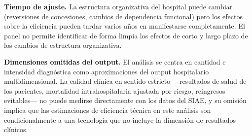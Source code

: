 \textbf{Tiempo de ajuste.} La estructura organizativa del hospital puede cambiar (reversiones de concesiones, cambios de dependencia funcional) pero los efectos sobre la eficiencia pueden tardar varios años en manifestarse completamente. El panel no permite identificar de forma limpia los efectos de corto y largo plazo de los cambios de estructura organizativa.

\textbf{Dimensiones omitidas del output.} El análisis se centra en cantidad e intensidad diagnóstica como aproximaciones del output hospitalario multidimensional. La calidad clínica en sentido estricto ---resultados de salud de los pacientes, mortalidad intrahospitalaria ajustada por riesgo, reingresos evitables--- no puede medirse directamente con los datos del SIAE, y su omisión implica que las estimaciones de eficiencia técnica en este análisis son condicionalmente a una tecnología que no incluye la dimensión de resultados clínicos.



